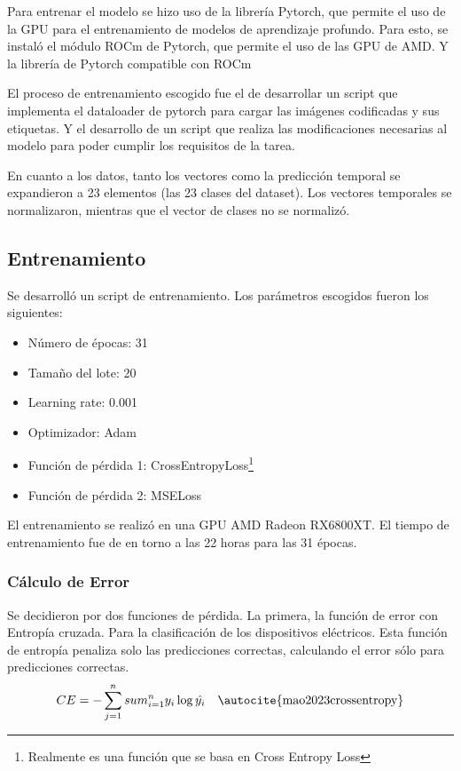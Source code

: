 Para entrenar el modelo se hizo uso de la librería Pytorch, que permite el uso de la GPU para el entrenamiento de modelos de aprendizaje profundo.
Para esto, se instaló el módulo ROCm de Pytorch, que permite el uso de las GPU de AMD. Y la librería de Pytorch compatible con ROCm

El proceso de entrenamiento escogido fue el de desarrollar un script que implementa el dataloader de pytorch para cargar las imágenes codificadas y sus etiquetas. Y el desarrollo de un script que realiza las modificaciones necesarias al modelo para poder cumplir los requisitos de la tarea.  

En cuanto a los datos, tanto los vectores como la predicción temporal se expandieron a 23 elementos (las 23 clases del dataset). Los vectores temporales se normalizaron, mientras que el vector de clases no se normalizó.

\subsection{Entrenamiento}
Se desarrolló un script de entrenamiento. Los parámetros escogidos fueron los siguientes:
\begin{itemize}
    \item Número de épocas: 31
    \item Tamaño del lote: 20
    \item Learning rate: 0.001
    \item Optimizador: Adam
    \item Función de pérdida 1: CrossEntropyLoss\footnote{Realmente es una función que se basa en Cross Entropy Loss}
    \item Función de pérdida 2: MSELoss
\end{itemize}

El entrenamiento se realizó en una GPU AMD Radeon RX6800XT. El tiempo de entrenamiento fue de en torno a las 22 horas para las 31 épocas.

\subsubsection{Cálculo de Error}
Se decidieron por dos funciones de pérdida. La primera, la función de error con Entropía cruzada. Para la clasificación de los dispositivos eléctricos. Esta función de entropía penaliza solo las predicciones correctas, calculando el error sólo para predicciones correctas.
$$
CE=-\sum_{j=1}^{n}sum_{i=1}^{n} y_{i}\log{\hat{y_{i}}} \quad \text{\autocite{mao2023crossentropy}}
$$

